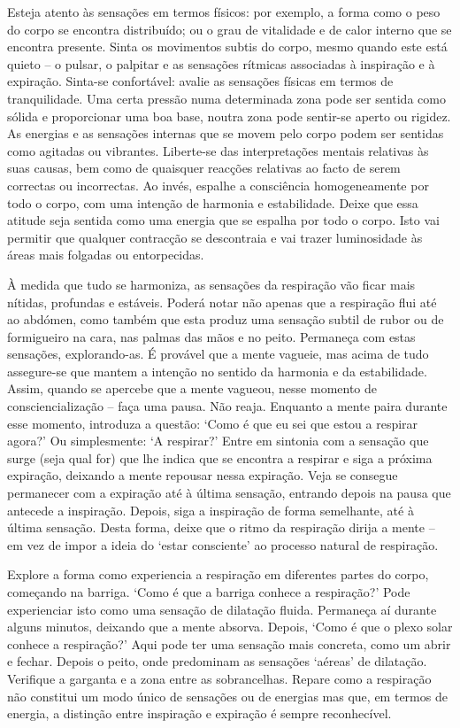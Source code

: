 Esteja atento às sensações em termos físicos: por exemplo, a forma como o peso
do corpo se encontra distribuído; ou o grau de vitalidade e de calor interno que
se encontra presente. Sinta os movimentos subtis do corpo, mesmo quando este
está quieto -- o pulsar, o palpitar e as sensações rítmicas associadas à
inspiração e à expiração. Sinta-se confortável: avalie as sensações físicas em
termos de tranquilidade. Uma certa pressão numa determinada zona pode ser
sentida como sólida e proporcionar uma boa base, noutra zona pode sentir-se
aperto ou rigidez. As energias e as sensações internas que se movem pelo corpo
podem ser sentidas como agitadas ou vibrantes. Liberte-se das interpretações
mentais relativas às suas causas, bem como de quaisquer reacções relativas ao
facto de serem correctas ou incorrectas. Ao invés, espalhe a consciência
homogeneamente por todo o corpo, com uma intenção de harmonia e estabilidade.
Deixe que essa atitude seja sentida como uma energia que se espalha por todo o
corpo. Isto vai permitir que qualquer contracção se descontraia e vai trazer
luminosidade às áreas mais folgadas ou entorpecidas.

\enlargethispage{\baselineskip}

À medida que tudo se harmoniza, as sensações da respiração vão ficar mais
nítidas, profundas e estáveis. Poderá notar não apenas que a respiração flui até
ao abdómen, como também que esta produz uma sensação subtil de rubor ou de
formigueiro na cara, nas palmas das mãos e no peito. Permaneça com estas
sensações, explorando-as. É provável que a mente vagueie, mas acima de tudo
assegure-se que mantem a intenção no sentido da harmonia e da estabilidade.
Assim, quando se apercebe que a mente vagueou, nesse momento de
consciencialização -- faça uma pausa. Não reaja. Enquanto a mente paira durante
esse momento, introduza a questão: `Como é que eu sei que estou a respirar
agora?' Ou simplesmente: `A respirar?' Entre em sintonia com a sensação que
surge (seja qual for) que lhe indica que se encontra a respirar e siga a próxima
expiração, deixando a mente repousar nessa expiração. Veja se consegue
permanecer com a expiração até à última sensação, entrando depois na pausa que
antecede a inspiração. Depois, siga a inspiração de forma semelhante, até à
última sensação. Desta forma, deixe que o ritmo da respiração dirija a mente --
em vez de impor a ideia do `estar consciente' ao processo natural de respiração.

Explore a forma como experiencia a respiração em diferentes partes do corpo,
começando na barriga. `Como é que a barriga conhece a respiração?' Pode
experienciar isto como uma sensação de dilatação fluida. Permaneça aí durante
alguns minutos, deixando que a mente absorva. Depois, `Como é que o plexo solar
conhece a respiração?' Aqui pode ter uma sensação mais concreta, como um abrir e
fechar. Depois o peito, onde predominam as sensações `aéreas' de dilatação.
Verifique a garganta e a zona entre as sobrancelhas. Repare como a respiração
não constitui um modo único de sensações ou de energias mas que, em termos de
energia, a distinção entre inspiração e expiração é sempre reconhecível.


